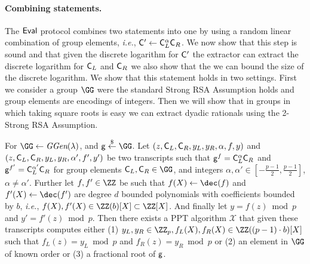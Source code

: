 \paragraph{Combining statements.} The $\textsf{{Eval}}$ protocol combines two statements into one by using a random linear combination of group elements, \emph{i.e.}, $\mathsf{C}'\gets \mathsf{C}_L^{\alpha}\mathsf{C}_R$. We now show that this step is sound and that given the discrete logarithm for $\mathsf{C}'$ the extractor can extract the discrete logarithm for $\mathsf{C}_L$ and $\mathsf{C}_R$ we also show that the we can bound the size of the discrete logarithm. We show that this statement holds in two settings. First we consider a group $\GG$ were the standard Strong RSA Assumption holds and group elements are encodings of integers. 
Then we will show that in groups in which taking square roots is easy we can extract dyadic rationals using the 2-Strong RSA Assumption.
\begin{lemma}
\label{lem:intrandomcombine}
	For $\GG \gets \ggen(\lambda)$, and $\gr{g}\sample \GG$. 
	Let $(z,\mathsf{C}_L,\mathsf{C}_R,y_L,y_R,\alpha,f,y)$ and  $(z,\mathsf{C}_L,\mathsf{C}_R,y_L,y_R,\alpha',f',y')$ be two transcripts such that $\mathsf{g}^{f}=\mathsf{C}_L^{\alpha}\mathsf{C}_R$ and $\mathsf{g}^{f'}=\mathsf{C}_L^{\alpha'}\mathsf{C}_R$ for group elements $\gr{C}_L,\gr{C}_R \in \GG$, and integers $\alpha,\alpha' \in  [-\frac{p-1}{2},\frac{p-1}{2}]$, $\alpha\neq \alpha'$. Further let $f,f'\in \ZZ$ be such that $f(X)\gets\dec(f)$ and $f'(X)\gets\dec(f')$ are degree $d$ bounded polynomials with coefficients bounded by $b$, \emph{i.e.}, $f(X),f'(X)\in \ZZ(b)[X]\subset \ZZ[X]$. And finally let $y=f(z)\bmod p$ and $y'=f'(z)\bmod p$.
	 Then there exists a PPT algorithm $\mathcal{X}$ that given these transcripts computes either (1) $y_L,y_R\in \ZZ_p,f_L(X),f_R(X)\in \ZZ((p-1) \cdot b)[X]$  such that $f_L(z)=y_L\bmod p$ and $f_R(z)=y_R \bmod p$ or (2) an element in $\GG$ of known order or (3) a fractional root of $\mathsf{g}$.
\end{lemma}
